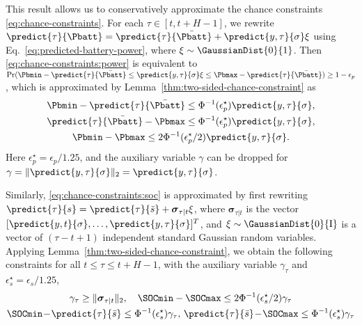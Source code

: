 This result allows us to conservatively approximate the chance constraints \eqref{eq:chance-constraints}.
For each \(\tau \in [t, t+H-1]\), we rewrite \(\predict{\tau}{\Pbatt} = \predict{\tau}{\bar{\Pbatt}} + \predict{y,\tau}{\sigma} \xi\) using Eq.~\eqref{eq:predicted-battery-power}, where \(\xi \sim \GaussianDist{0}{1}\).
Then \eqref{eq:chance-constraints:power} is equivalent to
\(\Pr(\Pbmin - \predict{\tau}{\bar{\Pbatt}} \leq \predict{y,\tau}{\sigma} \xi \leq \Pbmax - \predict{\tau}{\bar{\Pbatt}}) \geq 1 - \epsilon_p\),
which is approximated by Lemma~\ref{thm:two-sided-chance-constraint} as
\begin{subequations}
\label{eq:chance-constraint-approx:power}
\begin{gather}
\Pbmin - \predict{\tau}{\bar{\Pbatt}} \leq \Phi^{-1}(\epsilon^\star_p) \predict{y,\tau}{\sigma}, \\
\predict{\tau}{\bar{\Pbatt}} - \Pbmax \leq \Phi^{-1}(\epsilon^\star_p) \predict{y,\tau}{\sigma}, \\
\Pbmin - \Pbmax \leq 2 \Phi^{-1}(\epsilon^\star_p / 2) \predict{y,\tau}{\sigma}  \text.
\end{gather}
\end{subequations}
Here \(\epsilon^\star_p = \epsilon_p / 1.25\), and the auxiliary variable \(\gamma\) can be dropped for \(\gamma = \| \predict{y,\tau}{\sigma} \|_2 = \predict{y,\tau}{\sigma}\).

Similarly,  \eqref{eq:chance-constraints:soc} is approximated by first rewriting \(\predict{\tau}{s} = \predict{\tau}{\bar{s}} + \boldsymbol{\sigma}_{\tau \vert t} \xi\), where \(\boldsymbol{\sigma}_{\tau \vert t}\) is the vector \([\predict{y,t}{\sigma}, \dots, \predict{y,\tau}{\sigma}]^T\),  and \(\xi \sim \GaussianDist{0}{\mathrm{I}}\) is a vector of \((\tau-t+1)\) independent standard Gaussian random variables.
Applying Lemma~\ref{thm:two-sided-chance-constraint}, we obtain the following constraints for all \(t \leq \tau \leq t+H-1\), with the auxiliary variable \(\gamma_\tau\) and \(\epsilon^\star_s = \epsilon_s / 1.25\),
\begin{subequations}\label{eq:chance-constraint-approx:soc}
\begin{gather}
\gamma_\tau \geq \| \boldsymbol{\sigma}_{\tau \vert t} \|_2, \quad
\SOCmin - \SOCmax \leq 2 \Phi^{-1}(\epsilon^\star_s / 2) \gamma_\tau \\
\SOCmin \!-\! \predict{\tau}{\bar{s}} \leq \Phi^{-1}(\epsilon^\star_s) \gamma_\tau, \,
\predict{\tau}{\bar{s}} \!-\! \SOCmax \leq \Phi^{-1}(\epsilon^\star_s) \gamma_\tau
\end{gather}
\end{subequations}

